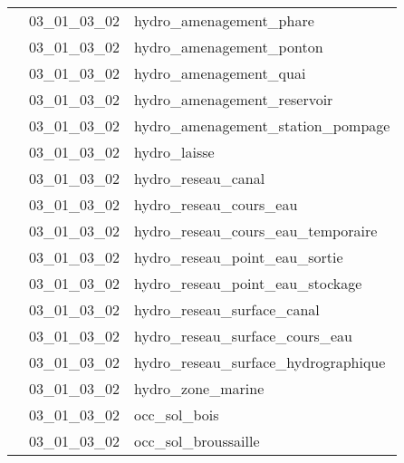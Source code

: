 \documentclass[12pt,titlepage]{book}
\begin{document}
\begin{supertabular}{|p{10cm}|c|p{15cm}|}
                    & 03\_01\_03\_02 & hydro\_amenagement\_phare\\


                    & 03\_01\_03\_02 & hydro\_amenagement\_ponton\\


                    & 03\_01\_03\_02 & hydro\_amenagement\_quai\\


                    & 03\_01\_03\_02 & hydro\_amenagement\_reservoir\\


                    & 03\_01\_03\_02 & hydro\_amenagement\_station\_pompage\\


                    & 03\_01\_03\_02 & hydro\_laisse\\


                    & 03\_01\_03\_02 & hydro\_reseau\_canal\\


                    & 03\_01\_03\_02 & hydro\_reseau\_cours\_eau\\


                    & 03\_01\_03\_02 & hydro\_reseau\_cours\_eau\_temporaire\\


                    & 03\_01\_03\_02 & hydro\_reseau\_point\_eau\_sortie\\


                    & 03\_01\_03\_02 & hydro\_reseau\_point\_eau\_stockage\\


                    & 03\_01\_03\_02 & hydro\_reseau\_surface\_canal\\


                    & 03\_01\_03\_02 & hydro\_reseau\_surface\_cours\_eau\\


                    & 03\_01\_03\_02 & hydro\_reseau\_surface\_hydrographique\\


                    & 03\_01\_03\_02 & hydro\_zone\_marine\\


                    & 03\_01\_03\_02 & occ\_sol\_bois\\


                    & 03\_01\_03\_02 & occ\_sol\_broussaille\\



\end{supertabular}
\end{document}
